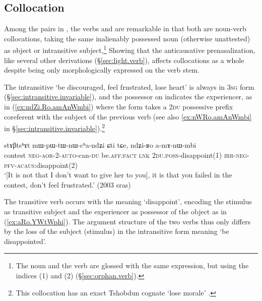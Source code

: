 \subsection{Collocation} \label{sec:anticausative.collocation}
Among the pairs in , the verbs  and  are remarkable in that both are noun-verb collocations, taking the same inalienably possessed noun  (otherwise unattested) as object or intransitive subject,\footnote{The noun and the verb are glossed with the same expression, but using the indices (1) and (2) (§\ref{sec:orphan.verb}).   } Showing that the anticausative prenasalization, like several other derivations (§\ref{sec:light.verb}), affects collocations as a whole despite being only morphologically expressed on the verb stem.

The intransitive  `be discouraged, feel frustrated, lose heart' is always in \textsc{3sg} form (§\ref{sec:intransitive.invariable}), and the possessor on  indicates the experiencer, as in (\ref{ex:ndZi.Ro.amAnWmbi}) where the form  takes a \textsc{2du} possessive prefix coreferent with the subject of the previous verb (see also \ref{ex:nWRo.amAnWmbi} in §\ref{sec:intransitive.invariable}).\footnote{This collocation has an exact Tshobdun cognate  `lose morale' \citep[708]{jackson19tshobdun}. }

\begin{exe}
\ex \label{ex:ndZi.Ro.amAnWmbi}
\gll stɤβtsʰɤt mɯ-pɯ-tɯ-nɯ-cʰa-ndʑi ɕti tɕe, ndʑi-ʁo a-mɤ-nɯ-mbi  \\
contest \textsc{neg}-\textsc{aor}-2-\textsc{auto}-can-\textsc{du} be.\textsc{aff}:\textsc{fact} \textsc{lnk} \textsc{2du}.\textsc{poss}-disappoint(1) \textsc{irr}-\textsc{neg}-\textsc{pfv}-\textsc{acaus}:disappoint(2) \\
\glt `[It is not that I don't want to give her to you], it is that you failed in the contest, don't feel frustrated.' (2003 sras)
\end{exe}

The transitive verb  occurs with the meaning `disappoint', encoding the stimulus as transitive subject and the experiencer as possessor of the object as in (\ref{ex:aRo.YWtWphi}). The argument structure of the two verbs thus only differs by the loss of the subject (stimulus) in the intransitive form  meaning `be disappointed'.

